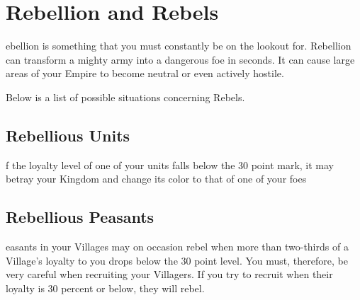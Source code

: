 
\chapter{Rebellion and Rebels}

ebellion is something that you must constantly be on the lookout for. Rebellion can transform a mighty army into a dangerous foe in seconds. It can cause large areas of your Empire to become neutral or even actively hostile.

Below is a list of possible situations concerning Rebels.

\section{Rebellious Units}


f the loyalty level of one of your units falls below the 30 point mark, it may betray your Kingdom and change its color to that of one of your foes

\section{Rebellious Peasants}


easants in your Villages may on occasion rebel when more than two-thirds of a Village’s loyalty to you drops below the 30 point level. You must, therefore, be very careful when recruiting your Villagers. If you try to recruit when their loyalty is 30 percent or below, they will rebel.

